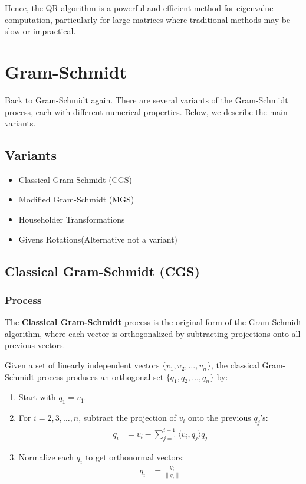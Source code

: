 \documentclass[article]{IEEEtran}
\numberwithin{equation}{enumi}
\numberwithin{figure}{enumi}
\begin{document}
Hence, the QR algorithm is a powerful and efficient method for eigenvalue computation, particularly for large matrices where traditional methods may be slow or impractical.

\section{Gram-Schmidt}
Back to Gram-Schmidt again.
There are several variants of the Gram-Schmidt process, each with different numerical properties. Below, we describe the main variants.
\subsection{Variants}
\begin{itemize}
    \item Classical Gram-Schmidt (CGS)
    \item Modified Gram-Schmidt (MGS)
    \item Householder Transformations
    \item Givens Rotations(Alternative not a variant)
\end{itemize}

\subsection{Classical Gram-Schmidt (CGS)}

\subsubsection{Process}
The \textbf{Classical Gram-Schmidt} process is the original form of the Gram-Schmidt algorithm, where each vector is orthogonalized by subtracting projections onto all previous vectors.

Given a set of linearly independent vectors $ \{v_1, v_2, \dots, v_n\} $, the classical Gram-Schmidt process produces an orthogonal set $ \{q_1, q_2, \dots, q_n\} $ by:

\begin{enumerate}
    \item Start with $ q_1 = v_1 $.
    \item For $ i = 2, 3, \dots, n $, subtract the projection of $ v_i $ onto the previous $ q_j $'s:
    \begin{align*}
    q_i &= v_i - \sum_{j=1}^{i-1} \langle v_i, q_j \rangle q_j
    \end{align*}
    \item Normalize each $ q_i $ to get orthonormal vectors:
    \begin{align*}
    q_i &= \frac{q_i}{\|q_i\|}
    \end{align*}
\end{enumerate}
\end{document}
